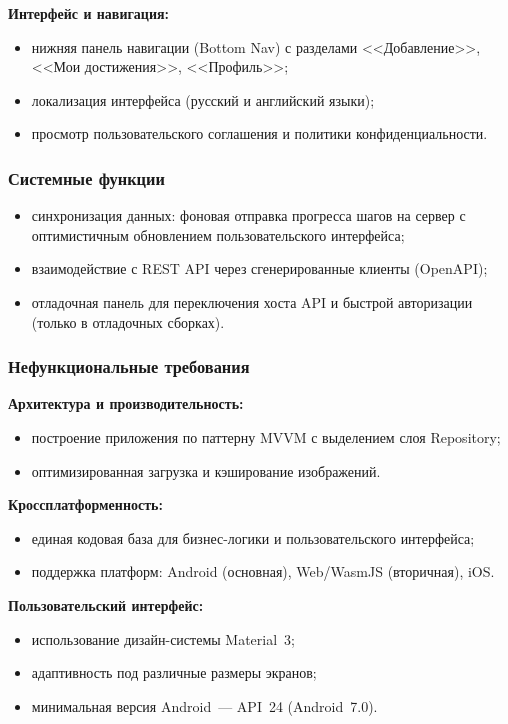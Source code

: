 \documentclass[../main.tex]{subfiles}
\begin{document}
\textbf{Интерфейс и навигация:}
\begin{itemize}[leftmargin=*]
	\item нижняя панель навигации (Bottom Nav) с разделами <<Добавление>>, <<Мои достижения>>, <<Профиль>>;
	\item локализация интерфейса (русский и английский языки);
	\item просмотр пользовательского соглашения и политики конфиденциальности.
\end{itemize}

\subsubsection{Системные функции}

\begin{itemize}[leftmargin=*]
	\item синхронизация данных: фоновая отправка прогресса шагов на сервер с оптимистичным обновлением пользовательского интерфейса;
	\item взаимодействие с REST API через сгенерированные клиенты (OpenAPI);
	\item отладочная панель для переключения хоста API и быстрой авторизации (только в отладочных сборках).
\end{itemize}

\subsubsection{Нефункциональные требования}

\textbf{Архитектура и производительность:}
\begin{itemize}[leftmargin=*]
	\item построение приложения по паттерну MVVM с выделением слоя Repository;
	\item оптимизированная загрузка и кэширование изображений.
\end{itemize}

\textbf{Кроссплатформенность:}
\begin{itemize}[leftmargin=*]
	\item единая кодовая база для бизнес-логики и пользовательского интерфейса;
	\item поддержка платформ: Android (основная), Web/WasmJS (вторичная), iOS.
\end{itemize}

\textbf{Пользовательский интерфейс:}
\begin{itemize}[leftmargin=*]
	\item использование дизайн-системы Material~3;
	\item адаптивность под различные размеры экранов;
	\item минимальная версия Android~--- API~24 (Android~7.0).
\end{itemize}
\end{document}
